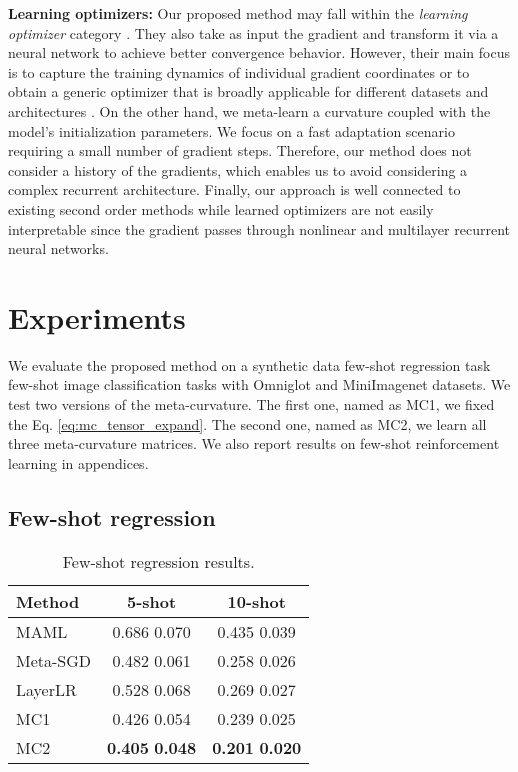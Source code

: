 \documentclass{article}
\begin{document}
\textbf{Learning optimizers:}
Our proposed method may fall within the \textit{learning optimizer} category \cite{Ravi-iclr-2017, Andrychowicz-nips-2016,Wichrowska-icml17,Metz-arxiv-2018}. They also take as input the gradient and transform it via a neural network to achieve better convergence behavior. However, their main focus is to capture the training dynamics of individual gradient coordinates \cite{Ravi-iclr-2017, Andrychowicz-nips-2016} or to obtain a generic optimizer that is broadly applicable for different datasets and architectures \cite{Wichrowska-icml17,Metz-arxiv-2018,Andrychowicz-nips-2016}. On the other hand, we meta-learn a curvature coupled with the model’s initialization parameters. We focus on a fast adaptation scenario requiring a small number of gradient steps. Therefore, our method does not consider a history of the gradients, which enables us to avoid considering a complex recurrent architecture. Finally, our approach is well connected to existing second order methods while learned optimizers are not easily interpretable since the gradient passes through nonlinear and multilayer recurrent neural networks.

\section{Experiments}
\label{experiments}
We evaluate the proposed method on a synthetic data few-shot regression task few-shot image classification tasks with Omniglot and MiniImagenet datasets. We test two versions of the meta-curvature. The first one, named as MC1, we fixed the  Eq. \ref{eq:mc_tensor_expand}. The second one, named as MC2, we learn all three meta-curvature matrices. We also report results on few-shot reinforcement learning in appendices.

\subsection{Few-shot regression}
\begin{wraptable}{r}{6.5cm}
\caption{Few-shot regression results.}
\label{table:regression}
\begin{small}
\begin{tabular}{lcc}
\toprule
Method & 5-shot & 10-shot \\
\midrule
MAML               & 0.686  0.070 & 0.435  0.039 \\
Meta-SGD           & 0.482  0.061 & 0.258  0.026 \\
LayerLR            & 0.528  0.068 & 0.269  0.027 \\
MC1                & 0.426  0.054 & 0.239  0.025 \\
MC2                & \textbf{0.405}  \textbf{0.048} & \textbf{0.201}  \textbf{0.020} \\
\bottomrule
\end{tabular}
\end{small}
\end{wraptable}
\end{document}
